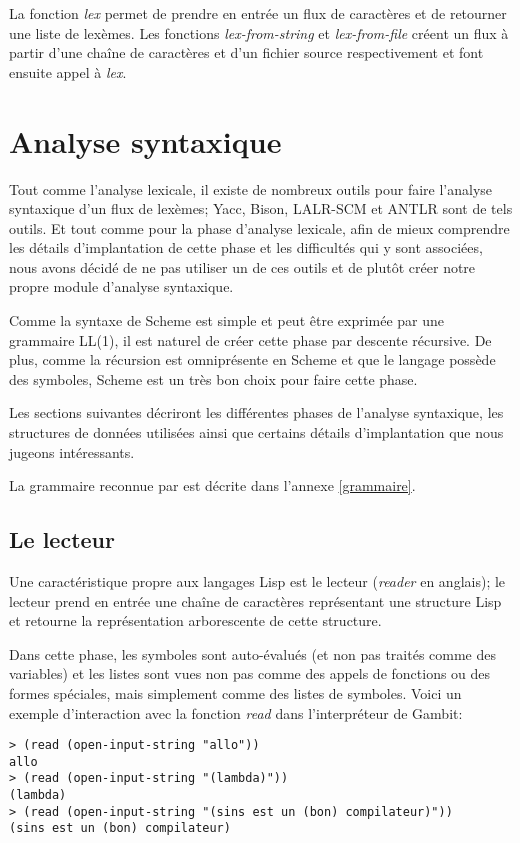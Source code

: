 \documentclass[11pt]{report}
\begin{document}
La fonction \emph{lex} permet de prendre en entrée un flux de
caractères et de retourner une liste de lexèmes.  Les fonctions
\emph{lex-from-string} et \emph{lex-from-file} créent un flux à partir
d'une chaîne de caractères et d'un fichier source respectivement et
font ensuite appel à \emph{lex}.


\chapter{Analyse syntaxique}

Tout comme l'analyse lexicale, il existe de nombreux outils pour faire
l'analyse syntaxique d'un flux de lexèmes; Yacc, Bison, LALR-SCM et
ANTLR sont de tels outils.  Et tout comme pour la phase d'analyse
lexicale, afin de mieux comprendre les détails d'implantation de cette
phase et les difficultés qui y sont associées, nous avons décidé de ne
pas utiliser un de ces outils et de plutôt créer notre propre module
d'analyse syntaxique.

Comme la syntaxe de Scheme est simple et peut être exprimée par une
grammaire LL(1), il est naturel de créer cette phase par descente
récursive.  De plus, comme la récursion est omniprésente en Scheme et
que le langage possède des symboles, Scheme est un très bon choix pour
faire cette phase.

Les sections suivantes décriront les différentes phases de l'analyse
syntaxique, les structures de données utilisées ainsi que certains
détails d'implantation que nous jugeons intéressants.

La grammaire reconnue par \sins{} est décrite dans l'annexe
\ref{grammaire}.


\section{Le lecteur}

Une caractéristique propre aux langages Lisp est le lecteur
(\emph{reader} en anglais); le lecteur prend en entrée une chaîne de
caractères représentant une structure Lisp et retourne la
représentation arborescente de cette structure.

Dans cette phase, les symboles sont auto-évalués (et non pas traités
comme des variables) et les listes sont vues non pas comme des appels
de fonctions ou des formes spéciales, mais simplement comme des listes
de symboles.  Voici un exemple d'interaction avec la fonction
\emph{read} dans l'interpréteur de Gambit:

\begin{verbatim}
> (read (open-input-string "allo"))
allo
> (read (open-input-string "(lambda)"))
(lambda)
> (read (open-input-string "(sins est un (bon) compilateur)"))
(sins est un (bon) compilateur)
\end{verbatim}
\end{document}
